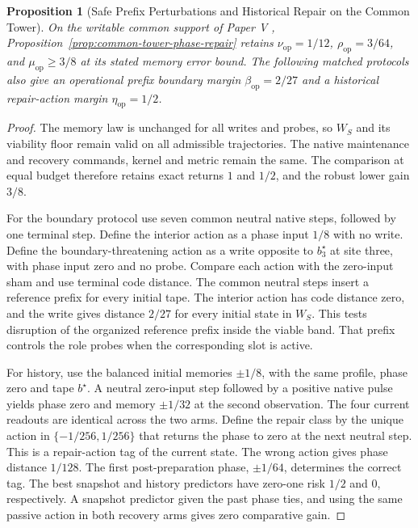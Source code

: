 \documentclass[11pt,a4paper]{article}
\newtheorem{proposition}{Proposition}[section]
\theoremstyle{definition}
\newcommand{\Bound}{\beta_{\mathrm{op}}}
\newcommand{\Persist}{\rho_{\mathrm{op}}}
\newcommand{\Maint}{\mu_{\mathrm{op}}}
\newcommand{\HistDep}{\eta_{\mathrm{op}}}
\newcommand{\Viab}{\nu_{\mathrm{op}}}
\begin{document}
\begin{proposition}[Safe Prefix Perturbations and Historical Repair on the Common Tower]\label{prop:writable-tower-viability}
On the writable common support of Paper V \cite{paper5}, Proposition~\ref{prop:common-tower-phase-repair} retains $\Viab=1/12$, $\Persist=3/64$, and $\Maint\ge3/8$ at its stated memory error bound. The following matched protocols also give an operational prefix boundary margin $\Bound=2/27$ and a historical repair-action margin $\HistDep=1/2$.
\end{proposition}
\begin{proof}
The memory law is unchanged for all writes and probes, so $W_S$ and its viability floor remain valid on all admissible trajectories. The native maintenance and recovery commands, kernel and metric remain the same. The comparison at equal budget therefore retains exact returns $1$ and $1/2$, and the robust lower gain $3/8$.

For the boundary protocol use seven common neutral native steps, followed by one terminal step. Define the interior action as a phase input $1/8$ with no write. Define the boundary-threatening action as a write opposite to $b^\star_3$ at site three, with phase input zero and no probe. Compare each action with the zero-input sham and use terminal code distance. The common neutral steps insert a reference prefix for every initial tape. The interior action has code distance zero, and the write gives distance $2/27$ for every initial state in $W_S$. This tests disruption of the organized reference prefix inside the viable band. That prefix controls the role probes when the corresponding slot is active.

For history, use the balanced initial memories $\pm1/8$, with the same profile, phase zero and tape $b^\star$. A neutral zero-input step followed by a positive native pulse yields phase zero and memory $\pm1/32$ at the second observation. The four current readouts are identical across the two arms. Define the repair class by the unique action in $\{-1/256,1/256\}$ that returns the phase to zero at the next neutral step. This is a repair-action tag of the current state. The wrong action gives phase distance $1/128$. The first post-preparation phase, $\pm1/64$, determines the correct tag. The best snapshot and history predictors have zero-one risk $1/2$ and $0$, respectively. A snapshot predictor given the past phase ties, and using the same passive action in both recovery arms gives zero comparative gain.
\end{proof}
\end{document}
